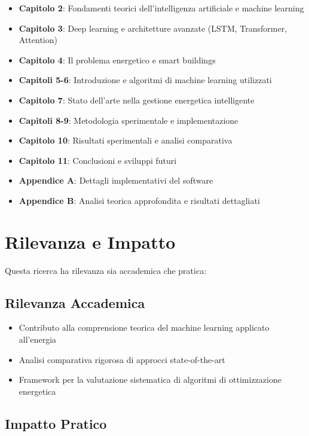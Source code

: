 \documentclass[12pt,a4paper,twoside]{report}
\begin{document}
\begin{itemize}
    \item \textbf{Capitolo 2}: Fondamenti teorici dell'intelligenza artificiale e machine learning
    \item \textbf{Capitolo 3}: Deep learning e architetture avanzate (LSTM, Transformer, Attention)
    \item \textbf{Capitolo 4}: Il problema energetico e smart buildings
    \item \textbf{Capitoli 5-6}: Introduzione e algoritmi di machine learning utilizzati
    \item \textbf{Capitolo 7}: Stato dell'arte nella gestione energetica intelligente
    \item \textbf{Capitoli 8-9}: Metodologia sperimentale e implementazione
    \item \textbf{Capitolo 10}: Risultati sperimentali e analisi comparativa
    \item \textbf{Capitolo 11}: Conclusioni e sviluppi futuri
    \item \textbf{Appendice A}: Dettagli implementativi del software
    \item \textbf{Appendice B}: Analisi teorica approfondita e risultati dettagliati
\end{itemize}

\section{Rilevanza e Impatto}

Questa ricerca ha rilevanza sia accademica che pratica:

\subsection{Rilevanza Accademica}

\begin{itemize}
    \item Contributo alla comprensione teorica del machine learning applicato all'energia
    \item Analisi comparativa rigorosa di approcci state-of-the-art
    \item Framework per la valutazione sistematica di algoritmi di ottimizzazione energetica
\end{itemize}

\subsection{Impatto Pratico}
\end{document}
